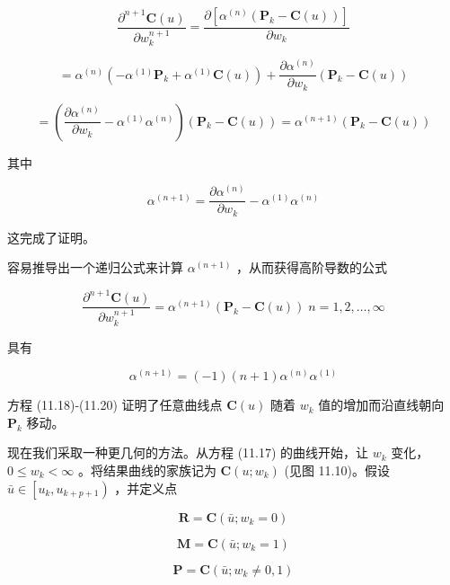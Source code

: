 \documentclass[../main.tex]{subfiles}
\begin{document}
\[
\frac{{\partial }^{n + 1}\mathbf{C}\left( u\right) }{\partial {w}_{k}^{n + 1}} = \frac{\partial \left\lbrack  {{\alpha }^{\left( n\right) }\left( {{\mathbf{P}}_{k} - \mathbf{C}\left( u\right) }\right) }\right\rbrack  }{\partial {w}_{k}}
\]

\[
= {\alpha }^{\left( n\right) }\left( {-{\alpha }^{\left( 1\right) }{\mathbf{P}}_{k} + {\alpha }^{\left( 1\right) }\mathbf{C}\left( u\right) }\right)  + \frac{\partial {\alpha }^{\left( n\right) }}{\partial {w}_{k}}\left( {{\mathbf{P}}_{k} - \mathbf{C}\left( u\right) }\right)
\]

\[
= \left( {\frac{\partial {\alpha }^{\left( n\right) }}{\partial {w}_{k}} - {\alpha }^{\left( 1\right) }{\alpha }^{\left( n\right) }}\right) \left( {{\mathbf{P}}_{k} - \mathbf{C}\left( u\right) }\right)  = {\alpha }^{\left( n + 1\right) }\left( {{\mathbf{P}}_{k} - \mathbf{C}\left( u\right) }\right)
\]

其中

\[
{\alpha }^{\left( n + 1\right) } = \frac{\partial {\alpha }^{\left( n\right) }}{\partial {w}_{k}} - {\alpha }^{\left( 1\right) }{\alpha }^{\left( n\right) }
\]

这完成了证明。

容易推导出一个递归公式来计算 \({\alpha }^{\left( n + 1\right) }\) ，从而获得高阶导数的公式

\[
\frac{{\partial }^{n + 1}\mathbf{C}\left( u\right) }{\partial {w}_{k}^{n + 1}} = {\alpha }^{\left( n + 1\right) }\left( {{\mathbf{P}}_{k} - \mathbf{C}\left( u\right) }\right) \;n = 1,2,\ldots ,\infty  \tag{11.19}
\]

具有

\[
{\alpha }^{\left( n + 1\right) } = \left( {-1}\right) \left( {n + 1}\right) {\alpha }^{\left( n\right) }{\alpha }^{\left( 1\right) } \tag{11.20}
\]

方程 (11.18)-(11.20) 证明了任意曲线点 \(\mathbf{C}\left( u\right)\) 随着 \({w}_{k}\) 值的增加而沿直线朝向 \({\mathbf{P}}_{k}\) 移动。

现在我们采取一种更几何的方法。从方程 (11.17) 的曲线开始，让 \({w}_{k}\) 变化， \(0 \leq  {w}_{k} < \infty\) 。将结果曲线的家族记为 \(\mathbf{C}\left( {u;{w}_{k}}\right)\) (见图 11.10)。假设 \(\bar{u} \in  \left\lbrack  {{u}_{k},{u}_{k + p + 1}}\right)\) ，并定义点

\[
\mathbf{R} = \mathbf{C}\left( {\bar{u};{w}_{k} = 0}\right)
\]

\[
\mathbf{M} = \mathbf{C}\left( {\bar{u};{w}_{k} = 1}\right)
\]

\[
\mathbf{P} = \mathbf{C}\left( {\bar{u};{w}_{k} \neq  0,1}\right)  \tag{11.21}
\]
\end{document}
